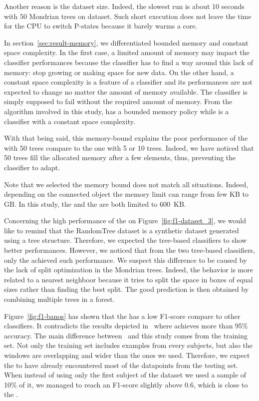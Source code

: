 Another reason is the dataset size. Indeed, the slowest run is about
10 seconds with 50 Mondrian trees on \recofitdataset dataset.  Such short
execution does not leave the time for the CPU to switch P-states because it
barely warms a core.

In section~\ref{sec:result-memory}, we differentiated bounded memory and
constant space complexity. In the first case, a limited amount of memory
may impact the classifier performances because the classifier has to find a way
around this lack of memory: stop growing or making space for new data.
On the other hand, a constant space complexity is a feature of a classifier and
its performances are not expected to change no  matter the amount of memory
available. The classifier is simply supposed to fail without the required
amount of memory. From the algorithm involved in this study, \mondrianforest
has a bounded memory policy while \naivebayes is a classifier with a constant
space complexity.

With that being said, this memory-bound explains the poor performance of the
\mondrianforest with 50 trees compare to the one with 5 or 10 trees. Indeed, we
have noticed that 50 trees fill the allocated memory after a few elements,
thus, preventing the classifier to adapt.  

Note that we selected the memory bound does not match all situations. Indeed,
depending on the connected object the memory limit can range from few KB to GB.
In this study, the \mondrianforest and the \FNN are both limited to 600~KB.

Concerning the high performance of the \hoeffdingtree on
Figure~\ref{fig:f1-dataset_3}, we would like to remind that the RandomTree
dataset is a synthetic dataset generated using a tree structure. Therefore, we
expected the tree-based classifiers to show better performances.  However, we
noticed that from the two tree-based classifiers, only the \hoeffdingtree
achieved such performance.  We suspect this difference to be caused by the lack
of split optimization in the Mondrian trees. Indeed, the \mondrianforest behavior is
more related to a nearest neighboor because it tries to split the space in
boxes of equal sizes rather than finding the best split. The good prediction is
then obtained by combining multiple trees in a forest.

Figure~\ref{fig:f1-banos} has shown that the \FNN has a low
F1-score compare to other classifiers. It contradicts the results
depicted in~\cite{omid_2019} where \FNN achieves more than 95\% 
accuracy. The main difference between~\cite{omid_2019} and this study comes
from the training set. Not only the training set includes examples from every
subjects, but also the windows are overlapping and wider than the ones we used.
Therefore, we expect the \FNN to have already encountered
most of the datapoints from the testing set. When instead of using only the
first subject of the \banosdataset dataset we used a sample of 10\% of it, we
managed to reach an F1-score slightly above 0.6, which is close to the \naivebayes.

